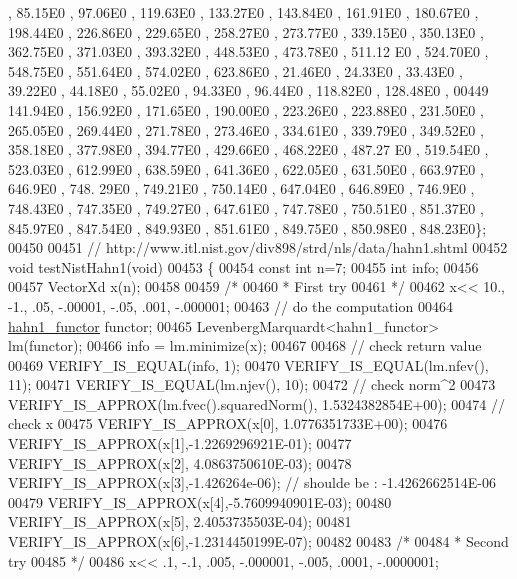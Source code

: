 \begin{DoxyCode}
      , 85.15E0 , 97.06E0 , 119.63E0 , 133.27E0 , 143.84E0 , 161.91E0 , 180.67E0 , 198.44E0 , 226.86E0 , 229.65E0 
      , 258.27E0 , 273.77E0 , 339.15E0 , 350.13E0 , 362.75E0 , 371.03E0 , 393.32E0 , 448.53E0 , 473.78E0 , 511.12
      E0 , 524.70E0 , 548.75E0 , 551.64E0 , 574.02E0 , 623.86E0 , 21.46E0 , 24.33E0 , 33.43E0 , 39.22E0 , 44.18E0 ,
       55.02E0 , 94.33E0 , 96.44E0 , 118.82E0 , 128.48E0 ,
00449 141.94E0 , 156.92E0 , 171.65E0 , 190.00E0 , 223.26E0 , 223.88E0 , 231.50E0 , 265.05E0 , 269.44E0 , 271.78E0
       , 273.46E0 , 334.61E0 , 339.79E0 , 349.52E0 , 358.18E0 , 377.98E0 , 394.77E0 , 429.66E0 , 468.22E0 , 487.27
      E0 , 519.54E0 , 523.03E0 , 612.99E0 , 638.59E0 , 641.36E0 , 622.05E0 , 631.50E0 , 663.97E0 , 646.9E0  , 748.
      29E0 , 749.21E0 , 750.14E0 , 647.04E0 , 646.89E0 , 746.9E0  , 748.43E0 , 747.35E0 , 749.27E0 , 647.61E0 , 
      747.78E0 , 750.51E0 , 851.37E0 , 845.97E0 , 847.54E0 , 849.93E0 , 851.61E0 , 849.75E0 , 850.98E0 , 848.23E0\};
00450 
00451 \textcolor{comment}{// http://www.itl.nist.gov/div898/strd/nls/data/hahn1.shtml}
00452 \textcolor{keywordtype}{void} testNistHahn1(\textcolor{keywordtype}{void})
00453 \{
00454   \textcolor{keyword}{const} \textcolor{keywordtype}{int}  n=7;
00455   \textcolor{keywordtype}{int} info;
00456 
00457   VectorXd x(n);
00458 
00459   \textcolor{comment}{/*}
00460 \textcolor{comment}{   * First try}
00461 \textcolor{comment}{   */}
00462   x<< 10., -1., .05, -.00001, -.05, .001, -.000001;
00463   \textcolor{comment}{// do the computation}
00464   \hyperlink{structhahn1__functor}{hahn1\_functor} functor;
00465   LevenbergMarquardt<hahn1\_functor> lm(functor);
00466   info = lm.minimize(x);
00467 
00468   \textcolor{comment}{// check return value}
00469   VERIFY\_IS\_EQUAL(info, 1);
00470   VERIFY\_IS\_EQUAL(lm.nfev(), 11);
00471   VERIFY\_IS\_EQUAL(lm.njev(), 10);
00472   \textcolor{comment}{// check norm^2}
00473   VERIFY\_IS\_APPROX(lm.fvec().squaredNorm(), 1.5324382854E+00);
00474   \textcolor{comment}{// check x}
00475   VERIFY\_IS\_APPROX(x[0], 1.0776351733E+00);
00476   VERIFY\_IS\_APPROX(x[1],-1.2269296921E-01);
00477   VERIFY\_IS\_APPROX(x[2], 4.0863750610E-03);
00478   VERIFY\_IS\_APPROX(x[3],-1.426264e-06); \textcolor{comment}{// shoulde be : -1.4262662514E-06}
00479   VERIFY\_IS\_APPROX(x[4],-5.7609940901E-03);
00480   VERIFY\_IS\_APPROX(x[5], 2.4053735503E-04);
00481   VERIFY\_IS\_APPROX(x[6],-1.2314450199E-07);
00482 
00483   \textcolor{comment}{/*}
00484 \textcolor{comment}{   * Second try}
00485 \textcolor{comment}{   */}
00486   x<< .1, -.1, .005, -.000001, -.005, .0001, -.0000001;

\end{DoxyCode}
